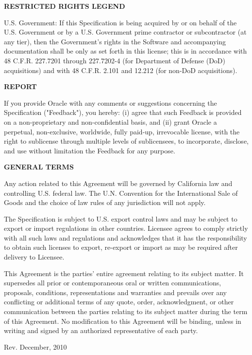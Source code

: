 \begin{flushleft}
{\bfseries RESTRICTED RIGHTS LEGEND}

U.S. Government: If this Specification is being acquired by or on behalf of the U.S. Government or by a U.S. Government prime contractor or subcontractor (at any tier), then the Government's rights in the Software and accompanying documentation shall be only as set forth in this license; this is in accordance with 48 C.F.R. 227.7201 through 227.7202-4 (for Department of Defense (DoD) acquisitions) and with 48 C.F.R. 2.101 and 12.212 (for non-DoD acquisitions). 

{\bfseries REPORT}

If you provide Oracle with any comments or suggestions concerning the Specification ("Feedback"), you hereby: (i) agree that such Feedback is provided on a non-proprietary and non-confidential basis, and (ii) grant Oracle a perpetual, non-exclusive, worldwide, fully paid-up, irrevocable license, with the right to sublicense through multiple levels of sublicensees, to incorporate, disclose, and use without limitation the Feedback for any purpose.

{\bfseries GENERAL TERMS}

Any action related to this Agreement will be governed by California law and controlling U.S. federal law. The U.N. Convention for the International Sale of Goods and the choice of law rules of any jurisdiction will not apply.

The Specification is subject to U.S. export control laws and may be subject to export or import regulations in other countries. Licensee agrees to comply strictly with all such laws and regulations and acknowledges that it has the responsibility to obtain such licenses to export, re-export or import as may be required after delivery to Licensee.

This Agreement is the parties' entire agreement relating to its subject matter. It supersedes all prior or contemporaneous oral or written communications, proposals, conditions, representations and warranties and prevails over any conflicting or additional terms of any quote, order,  acknowledgment, or other communication between the parties relating to its subject matter during the term of this Agreement. No modification to this Agreement will be binding, unless in writing and signed by an authorized representative of each party.

Rev. December, 2010

\end{flushleft}
